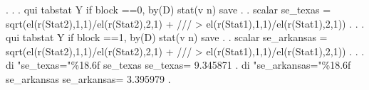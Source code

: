. 
. 
. qui tabstat Y if block ==0, by(D) stat(v n) save        
{\smallskip}
. 
. scalar se_texas = sqrt(el(r(Stat2),1,1)/el(r(Stat2),2,1) + /// 
>                                         el(r(Stat1),1,1)/el(r(Stat1),2,1))
{\smallskip}
.                                         
. 
. qui tabstat Y if block ==1, by(D) stat(v n) save        
{\smallskip}
. 
. scalar se_arkansas = sqrt(el(r(Stat2),1,1)/el(r(Stat2),2,1) + /// 
>                                         el(r(Stat1),1,1)/el(r(Stat1),2,1))
{\smallskip}
. 
. 
. di "se_texas="\%18.6f se_texas
se_texas=          9.345871
{\smallskip}
. di "se_arkansas="\%18.6f se_arkansas
se_arkansas=          3.395979
{\smallskip}
. 
